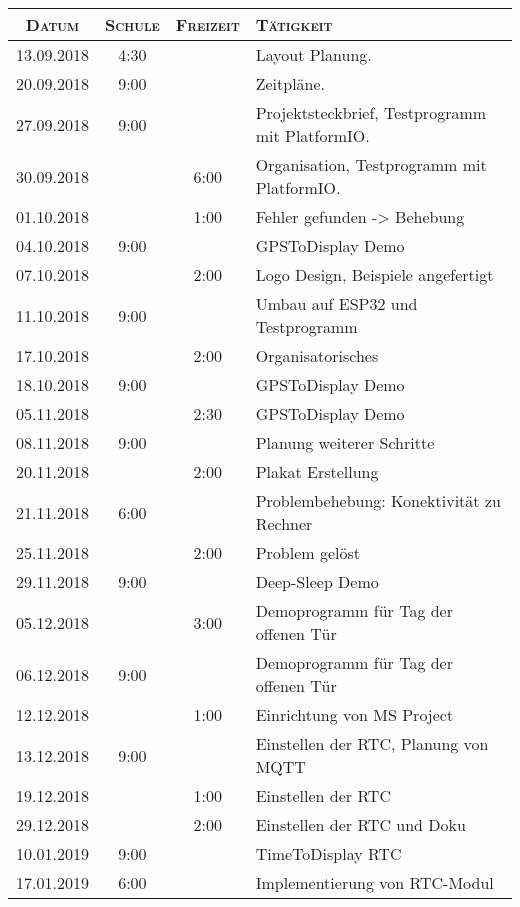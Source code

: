 \begin{longtable}[l]{|c|c|c|p{10cm}|}
\hline
{\scshape\bfseries Datum} & {\scshape\bfseries Schule} & {\scshape\bfseries Freizeit} & {\scshape\bfseries Tätigkeit} \\\hline\hline\endhead
13.09.2018  & 4:30 & &  Layout Planung.\\\hline
20.09.2018  & 9:00 & &  Zeitpläne.\\\hline
27.09.2018  & 9:00 & &  Projektsteckbrief, Testprogramm mit PlatformIO.\\\hline
30.09.2018  & & 6:00 &  Organisation, Testprogramm mit PlatformIO.\\\hline
01.10.2018  & & 1:00 &  Fehler gefunden -> Behebung\\\hline
04.10.2018  & 9:00 & &  GPSToDisplay Demo\\\hline
07.10.2018  & & 2:00 &  Logo Design, Beispiele angefertigt\\\hline
11.10.2018  & 9:00 & &  Umbau auf ESP32 und Testprogramm\\\hline
17.10.2018  & & 2:00 &  Organisatorisches\\\hline
18.10.2018  & 9:00 & &  GPSToDisplay Demo\\\hline
05.11.2018  & & 2:30 &  GPSToDisplay Demo\\\hline
08.11.2018  & 9:00 & &  Planung weiterer Schritte\\\hline
20.11.2018  & & 2:00 &  Plakat Erstellung\\\hline
21.11.2018  & 6:00 & &  Problembehebung: Konektivität zu Rechner\\\hline
25.11.2018  & & 2:00 &  Problem gelöst\\\hline
29.11.2018  & 9:00 & &  Deep-Sleep Demo\\\hline
05.12.2018  & & 3:00 &  Demoprogramm für Tag der offenen Tür\\\hline
06.12.2018  & 9:00 & &  Demoprogramm für Tag der offenen Tür\\\hline
12.12.2018  & & 1:00 &  Einrichtung von MS Project\\\hline
13.12.2018  & 9:00 & &  Einstellen der RTC, Planung von MQTT\\\hline
19.12.2018  & & 1:00 &  Einstellen der RTC\\\hline
29.12.2018  & & 2:00 &  Einstellen der RTC und Doku\\\hline
10.01.2019  & 9:00 & &  TimeToDisplay RTC\\\hline
17.01.2019  & 6:00 & &  Implementierung von RTC-Modul\\\hline

\end{longtable}

